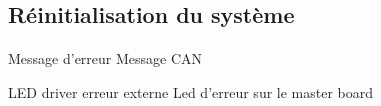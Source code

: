 \subsection{Réinitialisation du système}

\paragraph*{}
Message d'erreur Message CAN

LED driver erreur externe
Led d'erreur sur le master board